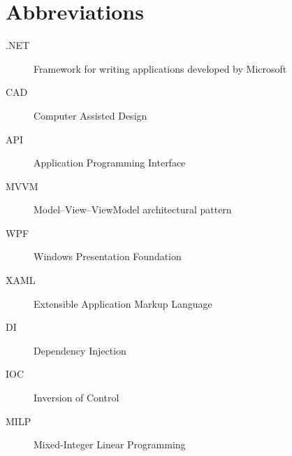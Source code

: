 \chapter{Abbreviations}
\label{ch:abbreviations}

\begin{description}
    \item[.NET] Framework for writing applications developed by Microsoft
    \item[CAD] Computer Assisted Design
    \item[API] Application Programming Interface
    \item[MVVM] Model–View–ViewModel architectural pattern
    \item[WPF] Windows Presentation Foundation
    \item[XAML] Extensible Application Markup Language
    \item[DI] Dependency Injection
    \item[IOC] Inversion of Control
    \item[MILP] Mixed-Integer Linear Programming
\end{description}
